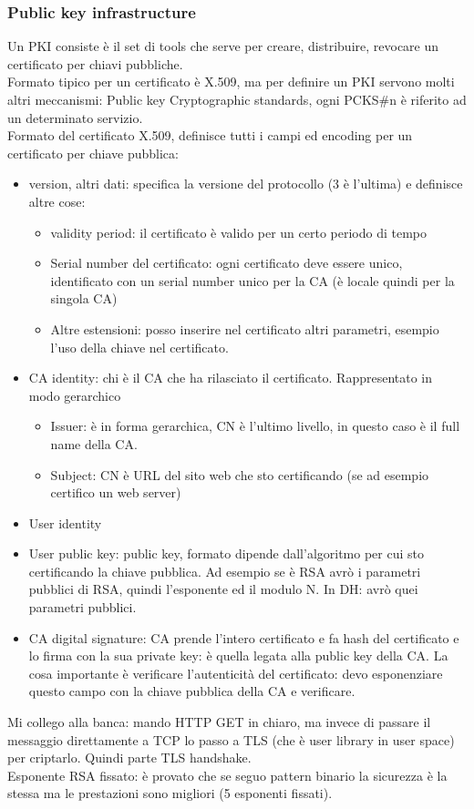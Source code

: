 \documentclass[16px]{article}
\begin{document}
\subsubsection{Public key infrastructure}
Un PKI consiste è il set di tools che serve per creare, distribuire, revocare un certificato per chiavi pubbliche.\\ Formato tipico per un certificato è X.509, ma per definire un PKI servono molti altri meccanismi: Public key Cryptographic standards, ogni PCKS\#n è riferito ad un determinato servizio.\\ Formato del certificato X.509, definisce tutti i campi ed encoding per un certificato per chiave pubblica:
\begin{itemize}
\item version, altri dati: specifica la versione del protocollo (3 è l'ultima) e definisce altre cose:
\begin{itemize}
\item validity period: il certificato è valido per un certo periodo di tempo
\item Serial number del certificato: ogni certificato deve essere unico, identificato con un serial number unico per la CA (è locale quindi per la singola CA)
\item Altre estensioni: posso inserire nel certificato altri parametri, esempio l'uso della chiave nel certificato.
\end{itemize}
\item CA identity: chi è il CA che ha rilasciato il certificato. Rappresentato in modo gerarchico
\begin{itemize}
\item Issuer: è in forma gerarchica, CN è l'ultimo livello, in questo caso è il full name della CA.
\item Subject: CN è URL del sito web che sto certificando (se ad esempio certifico un web server)
\end{itemize}
\item User identity
\item User public key: public key, formato dipende dall'algoritmo per cui sto certificando la chiave pubblica. Ad esempio se è RSA avrò i parametri pubblici di RSA, quindi l'esponente ed il modulo N. In DH: avrò quei parametri pubblici.
\item CA digital signature: CA prende l'intero certificato e fa hash del certificato e lo firma con la sua private key: è quella legata alla public key della CA. La cosa importante è verificare l'autenticità del certificato: devo esponenziare questo campo con la chiave pubblica della CA e verificare.
\end{itemize}
Mi collego alla banca: mando HTTP GET in chiaro, ma invece di passare il messaggio direttamente a TCP lo passo a TLS (che è user library in user space) per criptarlo. Quindi parte TLS handshake.\\ Esponente RSA fissato: è provato che se seguo pattern binario la sicurezza è la stessa ma le prestazioni sono migliori (5 esponenti fissati).
\end{document}
